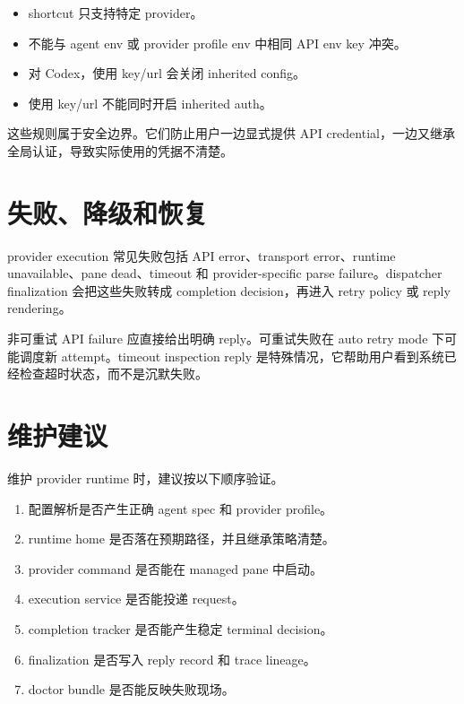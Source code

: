 \begin{itemize}
  \item shortcut 只支持特定 provider。
  \item 不能与 agent env 或 provider profile env 中相同 API env key 冲突。
  \item 对 Codex，使用 key/url 会关闭 inherited config。
  \item 使用 key/url 不能同时开启 inherited auth。
\end{itemize}

这些规则属于安全边界。它们防止用户一边显式提供 API credential，一边又继承全局认证，导致实际使用的凭据不清楚。

\section{失败、降级和恢复}

provider execution 常见失败包括 API error、transport error、runtime unavailable、pane dead、timeout 和 provider-specific parse failure。dispatcher finalization 会把这些失败转成 completion decision，再进入 retry policy 或 reply rendering。

非可重试 API failure 应直接给出明确 reply。可重试失败在 auto retry mode 下可能调度新 attempt。timeout inspection reply 是特殊情况，它帮助用户看到系统已经检查超时状态，而不是沉默失败。

\section{维护建议}

维护 provider runtime 时，建议按以下顺序验证。

\begin{enumerate}
  \item 配置解析是否产生正确 agent spec 和 provider profile。
  \item runtime home 是否落在预期路径，并且继承策略清楚。
  \item provider command 是否能在 managed pane 中启动。
  \item execution service 是否能投递 request。
  \item completion tracker 是否能产生稳定 terminal decision。
  \item finalization 是否写入 reply record 和 trace lineage。
  \item doctor bundle 是否能反映失败现场。
\end{enumerate}
